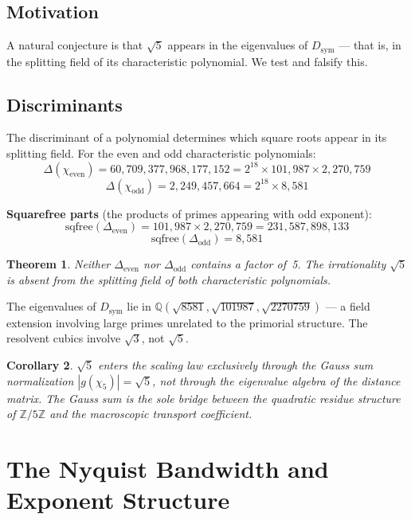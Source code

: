 \documentclass[11pt,letterpaper]{article}
\newtheorem{theorem}{Theorem}[section]
\newtheorem{corollary}[theorem]{Corollary}
\theoremstyle{definition}
\begin{document}
\subsection{Motivation}

A natural conjecture is that $\sqrt{5}$ appears in the eigenvalues of $D_{\text{sym}}$ --- that is, in the splitting field of its characteristic polynomial. We test and falsify this.

\subsection{Discriminants}

The discriminant of a polynomial determines which square roots appear in its splitting field. For the even and odd characteristic polynomials:
\[
\Delta(\chi_{\text{even}}) = 60{,}709{,}377{,}968{,}177{,}152
                            = 2^{18} \times 101{,}987 \times 2{,}270{,}759
\]
\[
\Delta(\chi_{\text{odd}}) = 2{,}249{,}457{,}664
                           = 2^{18} \times 8{,}581
\]

\textbf{Squarefree parts} (the products of primes appearing with odd exponent):
\[
\text{sqfree}(\Delta_{\text{even}}) = 101{,}987 \times 2{,}270{,}759 = 231{,}587{,}898{,}133
\]
\[
\text{sqfree}(\Delta_{\text{odd}}) = 8{,}581
\]

\begin{theorem}
Neither $\Delta_{\text{even}}$ nor $\Delta_{\text{odd}}$ contains a factor of~5. The irrationality $\sqrt{5}$ is absent from the splitting field of both characteristic polynomials.
\end{theorem}

The eigenvalues of $D_{\text{sym}}$ lie in $\mathbb{Q}(\sqrt{8581}, \sqrt{101987}, \sqrt{2270759})$ --- a field extension involving large primes unrelated to the primorial structure. The resolvent cubics involve $\sqrt{3}$, not $\sqrt{5}$.

\begin{corollary}
$\sqrt{5}$ enters the scaling law exclusively through the Gauss sum normalization $|g(\chi_5)| = \sqrt{5}$, not through the eigenvalue algebra of the distance matrix. The Gauss sum is the sole bridge between the quadratic residue structure of $\mathbb{Z}/5\mathbb{Z}$ and the macroscopic transport coefficient.
\end{corollary}


\section{The Nyquist Bandwidth and Exponent Structure}
\end{document}
